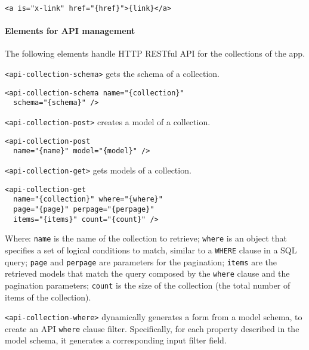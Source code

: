 \begin{lstlisting}[language=HTML5]
<a is="x-link" href="{href}">{link}</a>
\end{lstlisting}

\paragraph{Elements for API management}

The following elements handle HTTP RESTful API for the collections of the app.

\texttt{<api-collection-schema>} gets the schema of a collection. 

\begin{lstlisting}[language=HTML5]
<api-collection-schema name="{collection}" 
  schema="{schema}" />
\end{lstlisting}

\vspace{0.2cm}

\texttt{<api-collection-post>} creates a model of a collection. 

\begin{lstlisting}[language=HTML5]
<api-collection-post 
  name="{name}" model="{model}" />
\end{lstlisting}

\vspace{0.2cm}

\texttt{<api-collection-get>} gets models of a collection. 

\begin{lstlisting}[language=HTML5]
<api-collection-get 
  name="{collection}" where="{where}" 
  page="{page}" perpage="{perpage}"  
  items="{items}" count="{count}" />
\end{lstlisting}

Where: 
\texttt{name} is the name of the collection to retrieve; 
\texttt{where} is an object that specifies a set of logical conditions to match, similar to a \texttt{WHERE} clause in a SQL query;
\texttt{page} and \texttt{perpage} are parameters for the pagination;
\texttt{items} are the retrieved models that match the query composed by the \texttt{where} clause and the pagination parameters;
\texttt{count} is the size of the collection (the total number of items of the collection).

\vspace{0.2cm}

\texttt{<api-collection-where>} dynamically generates a form from a model schema, to create an API \texttt{where} clause filter. Specifically, for each property described in the model schema, it generates a corresponding input filter field. 

